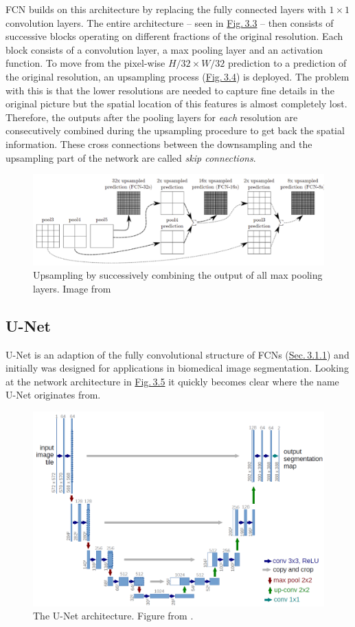 FCN builds on this architecture by replacing the fully connected layers with $1\times1$ convolution layers. The entire architecture – seen in \hyperref[fig:3.3]{Fig.\,3.3} – then consists of successive blocks operating on different fractions of the original resolution. Each block consists of a convolution layer, a max pooling layer and an activation function. To move from the pixel-wise $H/32\times W/32$ prediction to a prediction of the original resolution, an upsampling process (\hyperref[fig:3.4]{Fig.\,3.4}) is deployed. The problem with this is that the lower resolutions are needed to capture fine details in the original picture but the spatial location of this features is almost completely lost. Therefore, the outputs after the pooling layers for \textit{each} resolution are consecutively combined during the upsampling procedure to get back the spatial information. These cross connections between the downsampling and the upsampling part of the network are called \textit{skip connections}.

%
\begin{figure} \label{fig:3.4}
    \centering
    \includegraphics[width=.75\textwidth]{Chapters/figures/fcn2.PNG}
    \caption[FCN upsampling process]{Upsampling by successively combining the output of all max pooling layers. Image from \cite{fcn}}
\end{figure}
%
\subsection{U-Net} \label{sec:3.1.2}
U-Net \cite{unet} is an adaption of the fully convolutional structure of FCNs (\hyperref[sec:3.1.1]{Sec.\,3.1.1}) and initially was designed for applications in biomedical image segmentation. Looking at the network architecture in \hyperref[fig:3.5]{Fig.\,3.5} it quickly becomes clear where the name U-Net originates from.
%
\begin{figure}[h!] \label{fig:3.5}
    \centering
    \includegraphics[width=.70\textwidth]{Chapters/figures/unet.PNG}
    \caption[The U-Net architecture]{The U-Net architecture. Figure from \cite{unet}.}
\end{figure}
%

